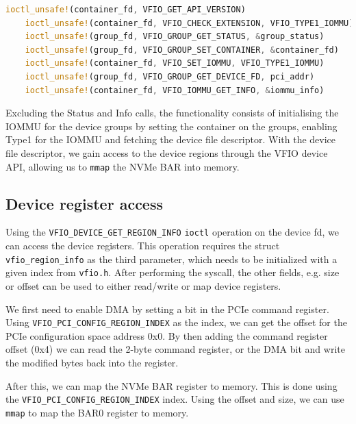 \begin{lstlisting}[language=Rust, caption={\texttt{ioctl} calls needed for IOMMU initialization}, label=lst:containerioctls]
    ioctl_unsafe!(container_fd, VFIO_GET_API_VERSION)
    ioctl_unsafe!(container_fd, VFIO_CHECK_EXTENSION, VFIO_TYPE1_IOMMU)
    ioctl_unsafe!(group_fd, VFIO_GROUP_GET_STATUS, &group_status)
    ioctl_unsafe!(group_fd, VFIO_GROUP_SET_CONTAINER, &container_fd)
    ioctl_unsafe!(container_fd, VFIO_SET_IOMMU, VFIO_TYPE1_IOMMU)
    ioctl_unsafe!(group_fd, VFIO_GROUP_GET_DEVICE_FD, pci_addr)
    ioctl_unsafe!(container_fd, VFIO_IOMMU_GET_INFO, &iommu_info)   
\end{lstlisting}

Excluding the Status and Info calls, the functionality consists of initialising the IOMMU for the device groups by setting the container on the groups, enabling Type1 for the IOMMU and fetching the device file descriptor. With the device file descriptor, we gain access to the device regions through the VFIO device API, allowing us to \texttt{mmap} the NVMe BAR into memory.

\subsection{Device register access}\label{sec:pcieconfig}
Using the \texttt{VFIO\_DEVICE\_GET\_REGION\_INFO} \texttt{ioctl} operation on the device fd, we can access the device registers. This operation requires the struct \texttt{vfio\_region\_info} as the third parameter, which needs to be initialized with a given index from \texttt{vfio.h}. After performing the syscall, the other fields, e.g. size or offset can be used to either read/write or map device registers.

We first need to enable DMA by setting a bit in the PCIe command register.
Using \texttt{VFIO\_PCI\_CONFIG\_REGION\_INDEX} as the index, we can get the offset for the PCIe configuration space address 0x0. By then adding the command register offset (0x4) we can read the 2-byte command register, or the DMA bit and write the modified bytes back into the register.

After this, we can map the NVMe BAR register to memory. This is done using the \texttt{VFIO\_PCI\_CONFIG\_REGION\_INDEX} index. Using the offset and size, we can use \texttt{mmap} to map the BAR0 register to memory.

